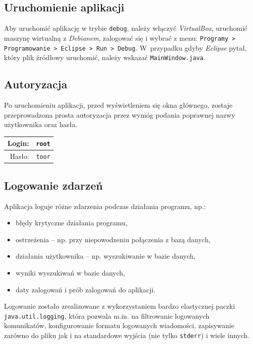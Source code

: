 \documentclass[a4paper,titlepage]{article}
\theoremstyle{break}
\numberwithin{equation}{subsection}
\begin{document}

\subsection{Uruchomienie aplikacji}

Aby uruchomić aplikację w trybie \texttt{debug}, należy włączyć \emph{VirtualBox}, uruchomić maszynę wirtualną z \emph{Debianem}, zalogować się i wybrać z menu: \texttt{Programy > Programowanie > Eclipse > Run > Debug}. W~przypadku gdyby \emph{Eclipse} pytał, który plik źródłowy uruchomić, należy wskazać \texttt{MainWindow.java}.


\subsection{Autoryzacja}
\label{sec:autoryzacja}

Po uruchomieniu aplikacji, przed wyświetleniem się okna głównego, zostaje przeprowadzona prosta autoryzacja przez wymóg podania poprawnej nazwy użytkownika oraz hasła.

\begin{tabular}{r|l}
Login: & \texttt{root}\\
\hline
Hasło: & \texttt{toor}\\
\end{tabular}


\subsection{Logowanie zdarzeń}
\label{sec:logowanie}

Aplikacja loguje różne zdarzenia podczas działania programu, np.:
\begin{itemize}
	\item błędy krytyczne działania programu,
	\item ostrzeżenia -- np. przy niepowodzeniu połączenia z bazą danych,
	\item działania użytkownika -- np. wyszukiwanie w bazie danych,
	\item wyniki wyszukiwań w bazie danych,
	\item daty zalogowań i prób zalogowań do aplikacji.
\end{itemize}
Logowanie zostało zrealizowane z wykorzystaniem bardzo elastycznej paczki \texttt{java.util.logging}, która pozwala m.in. na filtrowanie logowanych komunikatów, konfigurowanie formatu logowanych wiadomości, zapisywanie zarówno do pliku jak i na standardowe wyjścia (nie tylko \texttt{stderr}) i wiele innych.
\end{document}
